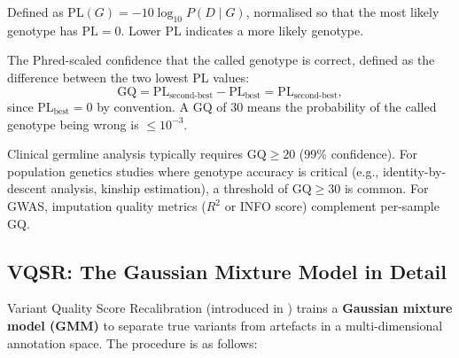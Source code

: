 \begin{description}[nosep]
  \item[PL (Phred-scaled Likelihood)] Defined as $\mathrm{PL}(G) = -10 \log_{10} P(D \mid G)$, normalised so that the most likely genotype has $\mathrm{PL} = 0$. Lower PL indicates a more likely genotype.
  \item[GQ (Genotype Quality)] The Phred-scaled confidence that the called genotype is correct, defined as the difference between the two lowest PL values:
    \begin{equation}
    \label{eq:variants:gq}
    \mathrm{GQ} = \mathrm{PL}_{\text{second-best}} - \mathrm{PL}_{\text{best}} = \mathrm{PL}_{\text{second-best}},
    \end{equation}
    since $\mathrm{PL}_{\text{best}} = 0$ by convention. A GQ of 30 means the probability of the called genotype being wrong is $\leq 10^{-3}$.
\end{description}

\begin{tipbox}[title={Minimum GQ Thresholds for Different Applications}]
Clinical germline analysis typically requires $\mathrm{GQ} \geq 20$ (99\% confidence). For population genetics studies where genotype accuracy is critical (e.g., identity-by-descent analysis, kinship estimation), a threshold of $\mathrm{GQ} \geq 30$ is common. For GWAS, imputation quality metrics ($R^2$ or INFO score) complement per-sample GQ.
\end{tipbox}

\subsection{VQSR: The Gaussian Mixture Model in Detail}
\label{subsec:variants:vqsr_detail}

Variant Quality Score Recalibration (introduced in ) trains a \textbf{Gaussian mixture model (GMM)} to separate true variants from artefacts in a multi-dimensional annotation space. The procedure is as follows:

